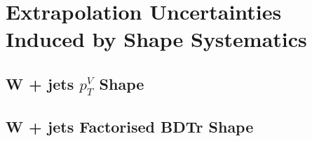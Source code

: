 \chapter{Extrapolation Uncertainties Induced by Shape Systematics}

\section{W + jets $p_T^V$ Shape}


\section{W + jets Factorised BDTr Shape}